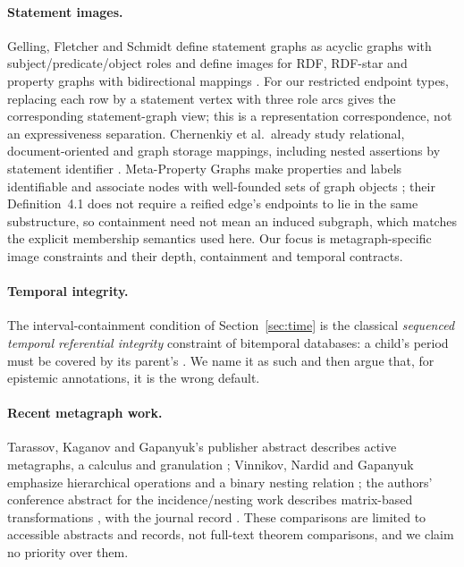 \documentclass[11pt]{article}
\theoremstyle{plain}
\theoremstyle{definition}
\theoremstyle{remark}
\begin{document}
\paragraph{Statement images.}
Gelling, Fletcher and Schmidt define statement graphs as acyclic graphs with
subject/predicate/object roles and define images for RDF, RDF-star and property graphs
with bidirectional mappings \cite{gelling2023bridging,gelling2024statement}. For our
restricted endpoint types, replacing each row by a statement vertex with three role arcs
gives the corresponding statement-graph view; this is a representation correspondence,
not an expressiveness separation. Chernenkiy et al.\ already study relational,
document-oriented and graph storage mappings, including nested assertions by statement
identifier \cite{chernenkiy2018storing}. Meta-Property Graphs make properties and
labels identifiable and associate nodes with well-founded sets of graph objects
\cite{sadoughi2024metaproperty}; their Definition~4.1 does not require a reified edge's
endpoints to lie in the same substructure, so containment need not mean an induced
subgraph, which matches the explicit membership semantics used here. Our focus is
metagraph-specific image constraints and their depth, containment and temporal
contracts.

\paragraph{Temporal integrity.}
The interval-containment condition of Section~\ref{sec:time} is the classical
\emph{sequenced temporal referential integrity} constraint of bitemporal databases: a
child's period must be covered by its parent's \cite{snodgrass1999developing,kulkarni2012temporal}.
We name it as such and then argue that, for epistemic annotations, it is the wrong default.

\paragraph{Recent metagraph work.}
Tarassov, Kaganov and Gapanyuk's publisher abstract describes active metagraphs, a
calculus and granulation \cite{tarassov2021metagraph}; Vinnikov, Nardid and Gapanyuk
emphasize hierarchical operations and a binary nesting relation \cite{vinnikov2025bigraph};
the authors' conference abstract for the incidence/nesting work describes matrix-based
transformations \cite{karabulatova2025abstract}, with the journal record
\cite{karabulatova2026incidence}. These comparisons are limited to accessible abstracts
and records, not full-text theorem comparisons, and we claim no priority over them.
\end{document}
